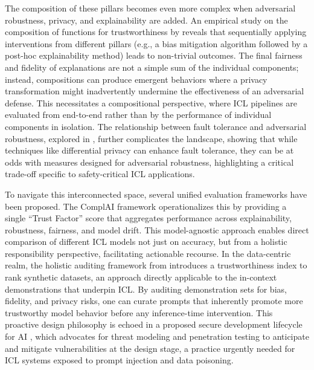 \documentclass[11pt]{article}
\begin{document}
The composition of these pillars becomes even more complex when adversarial robustness, privacy, and explainability are added. An empirical study on the composition of functions for trustworthiness by \cite{ref484} reveals that sequentially applying interventions from different pillars (e.g., a bias mitigation algorithm followed by a post-hoc explainability method) leads to non-trivial outcomes. The final fairness and fidelity of explanations are not a simple sum of the individual components; instead, compositions can produce emergent behaviors where a privacy transformation might inadvertently undermine the effectiveness of an adversarial defense. This necessitates a compositional perspective, where ICL pipelines are evaluated from end-to-end rather than by the performance of individual components in isolation. The relationship between fault tolerance and adversarial robustness, explored in \cite{ref485}, further complicates the landscape, showing that while techniques like differential privacy can enhance fault tolerance, they can be at odds with measures designed for adversarial robustness, highlighting a critical trade-off specific to safety-critical ICL applications.

To navigate this interconnected space, several unified evaluation frameworks have been proposed. The ComplAI framework \cite{ref486} operationalizes this by providing a single ``Trust Factor'' score that aggregates performance across explainability, robustness, fairness, and model drift. This model-agnostic approach enables direct comparison of different ICL models not just on accuracy, but from a holistic responsibility perspective, facilitating actionable recourse. In the data-centric realm, the holistic auditing framework from \cite{ref487} introduces a trustworthiness index to rank synthetic datasets, an approach directly applicable to the in-context demonstrations that underpin ICL. By auditing demonstration sets for bias, fidelity, and privacy risks, one can curate prompts that inherently promote more trustworthy model behavior before any inference-time intervention. This proactive design philosophy is echoed in a proposed secure development lifecycle for AI \cite{ref488}, which advocates for threat modeling and penetration testing to anticipate and mitigate vulnerabilities at the design stage, a practice urgently needed for ICL systems exposed to prompt injection and data poisoning.
\end{document}
